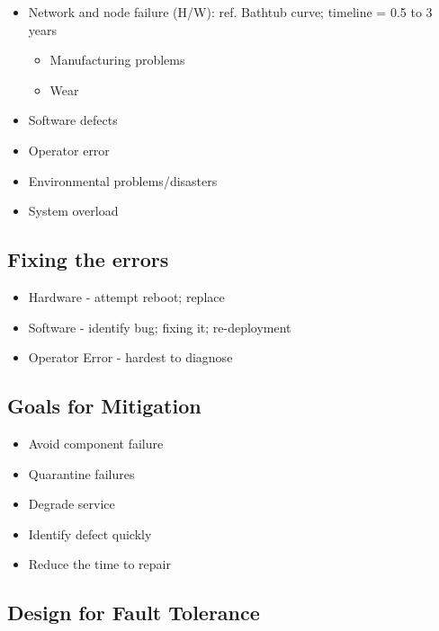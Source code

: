 \documentclass[a4paper]{article}
\begin{document}
\begin{itemize}
\item
    Network and node failure (H/W): ref. Bathtub curve; timeline = 0.5 to 3 years
    \begin{itemize}
        \item
        Manufacturing problems
    \item
        Wear
    \end{itemize}
\item
    Software defects
\item
    Operator error
\item
    Environmental problems/disasters
\item
    System overload
\end{itemize}

\subsection{Fixing the errors}

\begin{itemize}
\item
    Hardware - attempt reboot; replace
\item
    Software - identify bug; fixing it; re-deployment
\item
    Operator Error - hardest to diagnose
\end{itemize}

\subsection{Goals for Mitigation}

\begin{itemize}
\item
    Avoid component failure
\item
    Quarantine failures
\item
    Degrade service
\item
    Identify defect quickly
\item
    Reduce the time to repair
\end{itemize}

\subsection{Design for Fault Tolerance}
\end{document}

